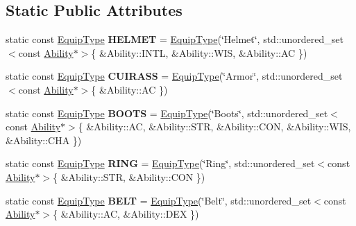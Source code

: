 \subsection*{Static Public Attributes}
\begin{DoxyCompactItemize}
\item 
\hypertarget{class_equip_type_a0ad3a2f66447465ec7bcf023517aad4d}{}\label{class_equip_type_a0ad3a2f66447465ec7bcf023517aad4d} 
static const \hyperlink{class_equip_type}{Equip\+Type} {\bfseries H\+E\+L\+M\+ET} = \hyperlink{class_equip_type}{Equip\+Type}(\char`\"{}Helmet\char`\"{}, std\+::unordered\+\_\+set$<$const \hyperlink{class_ability}{Ability}$\ast$$>$\{ \&Ability\+::\+I\+N\+TL, \&Ability\+::\+W\+IS, \&Ability\+::\+AC \})
\item 
\hypertarget{class_equip_type_a75eb1f613017700885b5ba17b869288f}{}\label{class_equip_type_a75eb1f613017700885b5ba17b869288f} 
static const \hyperlink{class_equip_type}{Equip\+Type} {\bfseries C\+U\+I\+R\+A\+SS} = \hyperlink{class_equip_type}{Equip\+Type}(\char`\"{}Armor\char`\"{}, std\+::unordered\+\_\+set$<$const \hyperlink{class_ability}{Ability}$\ast$$>$\{ \&Ability\+::\+AC \})
\item 
\hypertarget{class_equip_type_ad4fcb251950aa992744f8fa8501a830f}{}\label{class_equip_type_ad4fcb251950aa992744f8fa8501a830f} 
static const \hyperlink{class_equip_type}{Equip\+Type} {\bfseries B\+O\+O\+TS} = \hyperlink{class_equip_type}{Equip\+Type}(\char`\"{}Boots\char`\"{}, std\+::unordered\+\_\+set$<$const \hyperlink{class_ability}{Ability}$\ast$$>$\{ \&Ability\+::\+AC, \&Ability\+::\+S\+TR, \&Ability\+::\+C\+ON, \&Ability\+::\+W\+IS, \&Ability\+::\+C\+HA \})
\item 
\hypertarget{class_equip_type_ac6d91237e6bf68bceda1b19e57022b42}{}\label{class_equip_type_ac6d91237e6bf68bceda1b19e57022b42} 
static const \hyperlink{class_equip_type}{Equip\+Type} {\bfseries R\+I\+NG} = \hyperlink{class_equip_type}{Equip\+Type}(\char`\"{}Ring\char`\"{}, std\+::unordered\+\_\+set$<$const \hyperlink{class_ability}{Ability}$\ast$$>$\{ \&Ability\+::\+S\+TR, \&Ability\+::\+C\+ON \})
\item 
\hypertarget{class_equip_type_a09cc664449dd4ade565f79e45c835f95}{}\label{class_equip_type_a09cc664449dd4ade565f79e45c835f95} 
static const \hyperlink{class_equip_type}{Equip\+Type} {\bfseries B\+E\+LT} = \hyperlink{class_equip_type}{Equip\+Type}(\char`\"{}Belt\char`\"{}, std\+::unordered\+\_\+set$<$const \hyperlink{class_ability}{Ability}$\ast$$>$\{ \&Ability\+::\+AC, \&Ability\+::\+D\+EX \})
\item 
$$
\end{DoxyCompactItemize}

